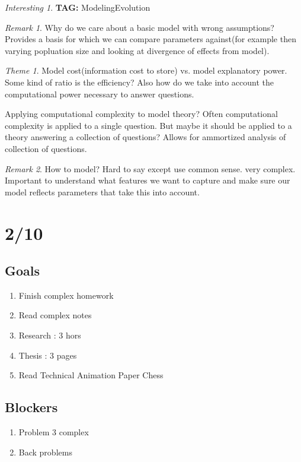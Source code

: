 \documentclass[11pt]{article}
\theoremstyle{remark}
\newtheorem{remark}{Remark}
\newtheorem{interest}{Interesting}
\newtheorem{theme}{Theme}
\begin{document}
\begin{interest}
\textbf{TAG:} ModelingEvolution

\begin{remark}
	Why do we care about a basic model with wrong assumptions? Provides a basis for which we can compare parameters against(for example then varying popluation size and looking at divergence of effects from model).
\end{remark}

\begin{theme}
	Model cost(information cost to store) vs. model explanatory power. Some kind of ratio is the efficiency? Also how do we take into account the computational power necessary to answer questions.

	Applying computational complexity to model theory? Often computational complexity is applied to a single question. But maybe it should be applied to a theory answering a collection of questions? Allows for ammortized analysis of collection of questions.
\end{theme}

\begin{remark}
	How to model? Hard to say except use common sense. very complex. Important to understand what features we want to capture and make sure our model reflects parameters that take this into account.
\end{remark}

\section{2/10}

\subsection{Goals}

\begin{enumerate}
	\item Finish complex homework
	\item Read complex notes	
	\item Research : 3 hors
	\item Thesis : 3 pages
	\item Read Technical Animation Paper
	 Chess
\end{enumerate}

\subsection{Blockers}

\begin{enumerate}
	\item Problem 3 complex
	\item Back problems
\end{enumerate}
	

\end{interest}
\end{document}

